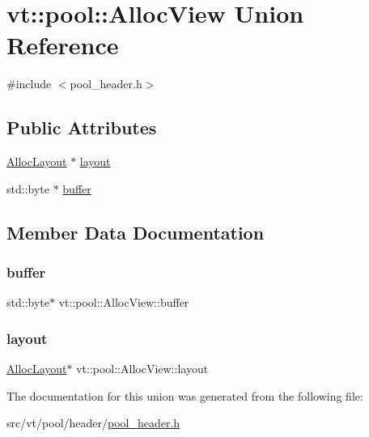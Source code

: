 \hypertarget{unionvt_1_1pool_1_1_alloc_view}{}\section{vt\+:\+:pool\+:\+:Alloc\+View Union Reference}
\label{unionvt_1_1pool_1_1_alloc_view}


{\ttfamily \#include $<$pool\+\_\+header.\+h$>$}

\subsection*{Public Attributes}
\begin{DoxyCompactItemize}
\item 
\hyperlink{structvt_1_1pool_1_1_alloc_layout}{Alloc\+Layout} $\ast$ \hyperlink{unionvt_1_1pool_1_1_alloc_view_a332dd2cdc50fc0101cb07a00f692daec}{layout}
\item 
std\+::byte $\ast$ \hyperlink{unionvt_1_1pool_1_1_alloc_view_af3b163f0425aec99f6421ee4d14e46a6}{buffer}
\end{DoxyCompactItemize}


\subsection{Member Data Documentation}
\mbox{\label{unionvt_1_1pool_1_1_alloc_view_af3b163f0425aec99f6421ee4d14e46a6}} 
\subsubsection{\texorpdfstring{buffer}{buffer}}
{\footnotesize\ttfamily std\+::byte$\ast$ vt\+::pool\+::\+Alloc\+View\+::buffer}

\mbox{\label{unionvt_1_1pool_1_1_alloc_view_a332dd2cdc50fc0101cb07a00f692daec}} 
\subsubsection{\texorpdfstring{layout}{layout}}
{\footnotesize\ttfamily \hyperlink{structvt_1_1pool_1_1_alloc_layout}{Alloc\+Layout}$\ast$ vt\+::pool\+::\+Alloc\+View\+::layout}



The documentation for this union was generated from the following file\+:\begin{DoxyCompactItemize}
\item 
src/vt/pool/header/\hyperlink{pool__header_8h}{pool\+\_\+header.\+h}\end{DoxyCompactItemize}
